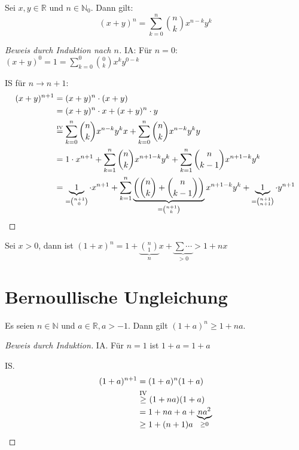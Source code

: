 \begin{theorem}
  Sei $x, y \in \mathbb{R}$ und $n \in \mathbb{N}_0$. Dann gilt: \[ (x+y)^n =  \sum_{k=0}^n \binom{n}{k} x^{n-k} y^k \]
\end{theorem}
\begin{proof}[Beweis durch Induktion nach $n$]
  IA: Für $n = 0$: $(x+y)^0 = 1 = \sum_{k=0}^0 \binom{0}{k} x^k y^{0-k}$

  IS für $n \to n+1$:
  \begin{align*}
    (x+y)^{n+1} &= (x+y)^n \cdot (x+y) \\
    \,&= (x+y)^n \cdot x + (x+y)^n \cdot y \\
    \,&\stackrel{\text{\tiny IV}}{=} \sum_{k=0}^n \binom{n}{k} x^{n-k} y^k x + \sum_{k=0}^n \binom{n}{k} x^{n-k} y^k y \\
    \,&= 1 \cdot x^{n+1} + \sum_{k=1}^n \binom{n}{k} x^{n+1-k}y^k + \sum_{k=1}^n \binom{n}{k-1} x^{n+1-k}y^k \\
    \,&= \underbrace{1}_{= \binom{n+1}{0}} \cdot x^{n+1} + \sum_{k=1}^n \underbrace{\left( \binom{n}{k} + \binom{n}{k-1} \right)}_{= \binom{n+1}{k}} x^{n+1-k} y^k + \underbrace{1}_{= \binom{n+1}{n+1}} \cdot y^{n+1}
  \end{align*}
\end{proof}
\begin{remark}
  Sei $x > 0$, dann ist \( (1+x)^n = 1 + \underbrace{\binom{n}{1}}_n x + \underbrace{\sum \cdots}_{> 0} > 1 +nx \)
\end{remark}

\section{Bernoullische Ungleichung}
\begin{theorem}
  Es seien $n \in \mathbb{N}$ und $a \in \mathbb{R}, a > -1$. Dann gilt $(1+a)^n \ge 1 + na$.
\end{theorem}
\begin{proof}[Beweis durch Induktion]
  IA. Für $n=1$ ist $1 + a = 1 + a$

  IS.
  \begin{align*}
    (1+a)^{n+1} &= (1+a)^n (1+a) \\
                &\stackrel{\text{\scriptsize IV}}{\ge} (1+na) (1+a) \\
    \,&= 1 + na + a + \smash{\underbrace{na^2}_{\ge 0}} \\
    \,&\ge 1 + (n+1)a
  \end{align*}
\end{proof}

